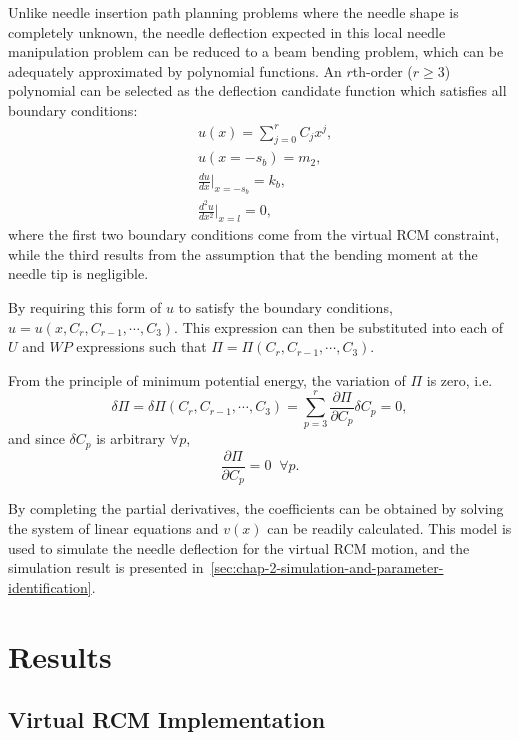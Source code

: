 Unlike needle insertion path planning problems where the needle shape is completely unknown, the needle deflection expected in this local needle manipulation problem can be reduced to a beam bending problem, which can be adequately approximated by polynomial functions. An $r$th-order ($r \geq 3$) polynomial can be selected as the deflection candidate function which satisfies all boundary conditions:
\begin{align}
  &u(x)= \sum_{j=0}^r C_j x^j,\\
  &u(x = -s_b)= m_2, \\
  &\frac{du}{dx}\biggr\rvert_{x=-s_b}= k_b, \\
  &\frac{d^2u}{dx^2}\biggr\rvert_{x=l}= 0,
\end{align}
where the first two boundary conditions come from the virtual RCM constraint, while the third results from the assumption that the bending moment at the needle tip is negligible.

By requiring this form of $u$ to satisfy the boundary conditions, $u = u(x, C_r, C_{r-1}, \cdots, C_3)$. This expression can then be substituted into each of $U$ and $WP$ expressions such that $\Pi = \Pi(C_r, C_{r-1}, \cdots, C_3)$.

From the principle of minimum potential energy, the variation of $\Pi$ is zero, i.e.
\begin{equation}
  \delta\Pi = \delta\Pi(C_r, C_{r-1}, \cdots, C_3) = \sum_{p=3}^{r} \frac{\partial\Pi}{\partial C_p}\delta C_p= 0,
\end{equation}
and since $\delta C_p$ is arbitrary $\forall p$,
\begin{equation}
  \frac{\partial\Pi}{\partial C_p} = 0 \;\; \forall p.
\end{equation}

By completing the partial derivatives, the coefficients can be obtained by solving the system of linear equations and $v(x)$ can be readily calculated. This model is used to simulate the needle deflection for the virtual RCM motion, and the simulation result is presented in~\cref{sec:chap-2-simulation-and-parameter-identification}.

\section{Results} 
\label{sec:chap-2-results}

\subsection{Virtual RCM Implementation} 
\label{sec:chap-2-virtual-rcm-implementation}

